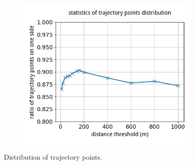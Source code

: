 \begin{figure}
  \centering
  \begin{subfigure}{0.34\textwidth}
    \centering
    \includegraphics[width = \textwidth, height = 0.66\textwidth]{Figures/Exp-statistic-side-ratio.png}
  \end{subfigure}
  \vspace{-2ex}
  \caption{\small Distribution of trajectory points.} \vspace{-3ex}
  \label{fig:traj-side-stat}
  \vspace{1ex}
\end{figure}








% 
